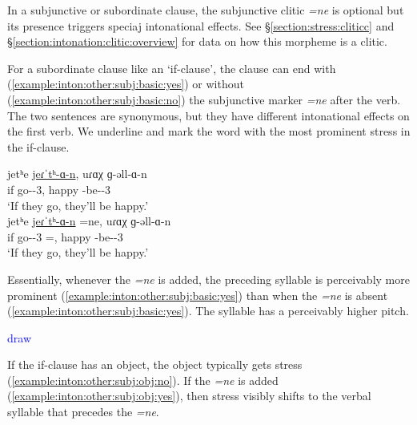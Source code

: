 In a subjunctive or subordinate clause, the subjunctive clitic \textit{=ne} is optional but its presence triggers speciaj   intonational effects.  See \S\ref{section:stress:cliticc} and \S\ref{section:intonation:clitic:overview} for data on how this morpheme  is a clitic.

For a subordinate clause like an `if-clause', the clause can end with (\ref{example:inton:other:subj:basic:yes}) or without (\ref{example:inton:other:subj:basic:no}) the subjunctive marker \textit{=ne} after the verb. The two sentences are synonymous, but they have different intonational effects on the first verb. We underline and mark the word with the most prominent stress in the if-clause. 

\begin{exe}
	\ex \begin{xlist}
		\ex \gll jetʰe \underline{jeɾˈtʰ-ɑ-n}, uɾɑχ ɡ-əll-ɑ-n  \\
		if go-{\thgloss}-3{\pl}, happy {\ind}-be-{\thgloss}-3{\pl} \\
		\trans `If they go, they'll be happy.'
		\label{example:inton:other:subj:basic:no}
		\\ 
		\ex \gll jetʰe \underline{jeɾˈtʰ-ɑ-n} =ne, uɾɑχ ɡ-əll-ɑ-n  \\
		if go-{\thgloss}-3{\pl} ={\sbjv}, happy {\ind}-be-{\thgloss}-3{\pl} \\
		\trans `If they go, they'll be happy.'
		\label{example:inton:other:subj:basic:yes}
		\\ 
	\end{xlist}
\end{exe}


Essentially, whenever the \textit{=ne} is added, the preceding syllable is perceivably more prominent (\ref{example:inton:other:subj:basic:yes}) than when the \textit{=ne} is absent (\ref{example:inton:other:subj:basic:yes}). The syllable has a perceivably higher pitch. 

\textcolor{blue}{draw}

If the if-clause has an object, the object typically gets stress (\ref{example:inton:other:subj:obj:no}). If the \textit{=ne} is added (\ref{example:inton:other:subj:obj:yes}), then stress visibly shifts to the verbal syllable that precedes the \textit{=ne}. 


